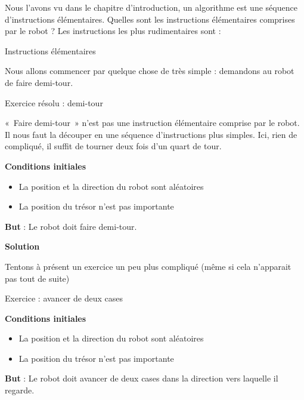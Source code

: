 	Nous l'avons vu dans le chapitre
	d'introduction, un algorithme est une séquence
	d'instructions élémentaires. Quelles sont les
	instructions élémentaires comprises par le robot ? Les instructions les
	plus rudimentaires sont :
	
	\begin{Emphase}[definition]{Instructions élémentaires}
	\end{Emphase}
		
	Nous allons commencer par quelque chose de très simple : demandons au
	robot de faire demi-tour.

	\begin{Emphase}[exercice]{Exercice résolu : demi-tour}

		«~Faire demi-tour~» n'est pas une instruction
		élémentaire comprise par le robot. Il nous faut la découper en une
		séquence d'instructions plus simples. Ici, rien de
		compliqué, il suffit de tourner deux fois d'un quart
		de tour.

		\textbf{Conditions initiales}

		\begin{itemize}
		\item La position et la direction du robot sont aléatoires
		\item La position du trésor n'est pas importante
		\end{itemize}

		\textbf{But} : Le robot doit faire demi-tour.

		\textbf{Solution}

		
	\end{Emphase}

	Tentons à présent un exercice un peu plus compliqué
	(même si cela n'apparait pas tout de suite)

	
	\begin{Emphase}[exercice]{Exercice : avancer de deux cases}

		\textbf{Conditions initiales}

		\begin{itemize}
		\item La position et la direction du robot sont aléatoires
		\item La position du trésor n'est pas importante
		\end{itemize}
		
		\textbf{But} : Le robot doit avancer de deux cases dans la direction
		vers laquelle il regarde.

	\end{Emphase}

